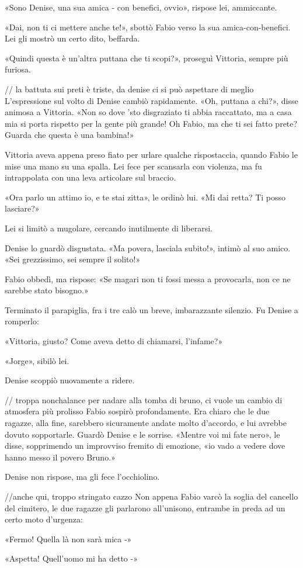 «Sono Denise, una sua amica - con benefici, ovvio», rispose lei, ammiccante.

«Dai, non ti ci mettere anche te!», sbottò Fabio verso la sua amica-con-benefici. Lei gli mostrò un certo dito, beffarda.

«Quindi questa è un'altra puttana che ti scopi?», proseguì Vittoria, sempre più furiosa.

// la battuta sui preti è triste, da denise ci si può aspettare di meglio
L'espressione sul volto di Denise cambiò rapidamente. «Oh, puttana a chi?», disse animosa a Vittoria. «Non so dove 'sto disgraziato ti abbia raccattato, ma a casa mia si porta rispetto per la gente più grande! Oh Fabio, ma che ti sei fatto prete? Guarda che questa è una bambina!»

Vittoria aveva appena preso fiato per urlare qualche rispostaccia, quando Fabio le mise una mano su una spalla. Lei fece per scansarla con violenza, ma fu intrappolata con una leva articolare sul braccio.

«Ora parlo un attimo io, e te stai zitta», le ordinò lui. «Mi dai retta? Ti posso lasciare?»

Lei si limitò a mugolare, cercando inutilmente di liberarsi.

Denise lo guardò disgustata. «Ma povera, lasciala subito!», intimò al suo amico. «Sei grezzissimo, sei sempre il solito!»

Fabio obbedì, ma rispose: «Se magari non ti fossi messa a provocarla, non ce ne sarebbe stato bisogno.»

Terminato il parapiglia, fra i tre calò un breve, imbarazzante silenzio. Fu Denise a romperlo:

«Vittoria, giusto? Come aveva detto di chiamarsi, l'infame?»

«Jorge», sibilò lei.

Denise scoppiò nuovamente a ridere.

// troppa nonchalance per nadare alla tomba di bruno, ci vuole un cambio di atmosfera più prolisso
Fabio sospirò profondamente. Era chiaro che le due ragazze, alla fine, sarebbero sicuramente andate molto d'accordo, e lui avrebbe dovuto sopportarle. Guardò Denise e le sorrise. «Mentre voi mi fate nero», le disse, sopprimendo un improvviso fremito di emozione, «io vado a vedere dove hanno messo il povero Bruno.»

Denise non rispose, ma gli fece l'occhiolino.

//anche qui, troppo stringato cazzo
Non appena Fabio varcò la soglia del cancello del cimitero, le due ragazze gli parlarono all'unisono, entrambe in preda ad un certo moto d'urgenza:

«Fermo! Quella là non sarà mica -»

«Aspetta! Quell'uomo mi ha detto -»
